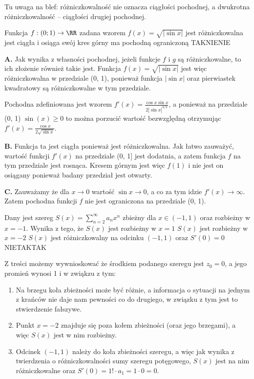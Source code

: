 \begin{solutions}
    \begin{editorsnote}
        Tu uwaga na blef: różniczkowalność nie oznacza ciągłości pochodnej, a dwukrotna różniczkowalność -- ciągłości drugiej pochodnej.
    \end{editorsnote}

    \sol Funkcja $f:(0;1) \to \RR$ zadana wzorem $f(x) = \sqrt{|\sin{x}|}$
    \answerss
    {jest różniczkowalna}
    {jest ciągła i osiąga swój kres górny}
    {ma pochodną ograniczoną}
    {TAK}{NIE}{NIE}

    \textbf{A.}  Jak wynika z własności pochodnej, jeżeli funkcje $f$ i $g$ są różniczkowalne, to ich złożenie również takie jest. Funkcja $f(x) = \sqrt{|\sin{x}|}$ jest więc różniczkowalna w przedziale (0, 1), ponieważ funkcja $|\sin{x}|$ oraz pierwiastek kwadratowy są różniczkowalne w tym przedziale.
    
    Pochodna zdefiniowana jest wzorem $f'(x) = \frac{\cos{x} \sin{x}}{2 |\sin{x}|^{3/2}}$, a ponieważ na przedziale (0, 1) $\sin(x) \ge 0$ to można porzucić wartość bezwzględną otrzymując $f'(x) = \frac{\cos{x} }{2 \sqrt{\sin{x}}}$.
    
    \textbf{B.} Funkcja ta jest ciągła ponieważ jest różniczkowalna. Jak łatwo zauważyć, wartość funkcji $f'(x)$ na przedziale (0, 1] jest dodatnia, a zatem funkcja $f$ na tym przedziale jest rosnąca. Kresem górnym jest więc $f(1)$ i nie jest on osiągany ponieważ badany przedział jest otwarty.

    \textbf{C.} Zauważamy że dla $x \rightarrow 0$ wartość $\sin{x} \rightarrow 0$, a co za tym idzie $f'(x) \rightarrow \infty$. Zatem pochodna funkcji $f$ nie jest ograniczona na przedziale (0, 1).
    
    \sol Dany jest szereg $S(x) = \sum_{n = 2}^{\infty} a_n x^n$ zbieżny dla $x \in (-1, 1)$ oraz rozbieżny w $x = -1$. Wynika z tego, że
    \answerss
    {$S(x)$ jest rozbieżny w $x = 1$}
    {$S(x)$ jest rozbieżny w $x = -2$}
    {$S(x)$ jest różniczkowalny na odcinku $(-1, 1)$ oraz $S'(0) = 0$}
    {NIE}{TAK}{TAK}

    Z treści możemy wywnioskować że środkiem podanego szeregu jest $z_0 = 0$, a jego promień wynosi 1 i w  zwiąkzu z tym:
    \begin{enumerate}[\bf A.]
        \item Na brzegu koła zbieżności może być różnie, a informacja o sytuacji na jednym z krańców nie daje nam pewności co do drugiego, w związku z tym jest to stwierdzenie fałszywe.
        \item Punkt $x=-2$ znajduje się poza kołem zbieżności (oraz jego brzegami), a więc $S(x)$ jest w nim rozbieżny.
        \item Odcinek $(-1, 1)$ należy do koła zbieżności szeregu, a więc jak wynika z twierdzenia o różniczkowalności sumy szeregu potęgowego, $S(x)$ jest na nim różniczkowalne oraz $S'(0) = 1! \cdot a_1 = 1 \cdot 0 = 0$.
    \end{enumerate} 


\end{solutions}
